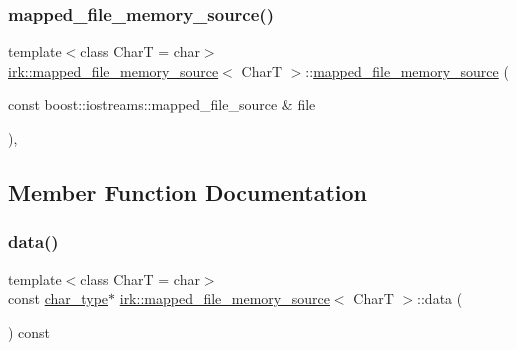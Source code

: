 \subsubsection{\texorpdfstring{mapped\+\_\+file\+\_\+memory\+\_\+source()}{mapped\_file\_memory\_source()}\hspace{0.1cm}{\footnotesize\ttfamily [2/2]}}
{\footnotesize\ttfamily template$<$class CharT  = char$>$ \\
\mbox{\hyperlink{classirk_1_1mapped__file__memory__source}{irk\+::mapped\+\_\+file\+\_\+memory\+\_\+source}}$<$ CharT $>$\+::\mbox{\hyperlink{classirk_1_1mapped__file__memory__source}{mapped\+\_\+file\+\_\+memory\+\_\+source}} (\begin{DoxyParamCaption}\item[{const boost\+::iostreams\+::mapped\+\_\+file\+\_\+source \&}]{file }\end{DoxyParamCaption})\hspace{0.3cm}{\ttfamily [inline]}, {\ttfamily [explicit]}}



\subsection{Member Function Documentation}
\mbox{\label{classirk_1_1mapped__file__memory__source_aed12180cbed20420b7d783b5a9705eb3}} 
\subsubsection{\texorpdfstring{data()}{data()}}
{\footnotesize\ttfamily template$<$class CharT  = char$>$ \\
const \mbox{\hyperlink{classirk_1_1mapped__file__memory__source_a9b4319787fae825c6a27be1e58447386}{char\+\_\+type}}$\ast$ \mbox{\hyperlink{classirk_1_1mapped__file__memory__source}{irk\+::mapped\+\_\+file\+\_\+memory\+\_\+source}}$<$ CharT $>$\+::data (\begin{DoxyParamCaption}{ }\end{DoxyParamCaption}) const\hspace{0.3cm}{\ttfamily [inline]}}

\mbox{\label{classirk_1_1mapped__file__memory__source_a6e49ffba65ef2c28955d45d0fd50b4d4}} 
